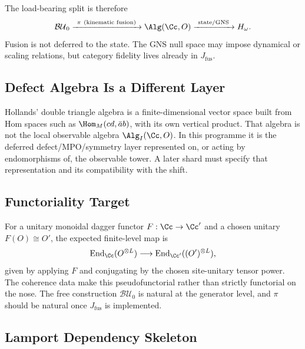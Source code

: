 The load-bearing split is therefore
\[
  \mathcal{BU}_0
  \xrightarrow{\ \pi\ \text{(kinematic fusion)}\ }
  \Alg(\Cc,O)
  \xrightarrow{\ \text{state/GNS}\ }
  H_\omega .
\]
Fusion is not deferred to the state.  The GNS null space may impose dynamical or
scaling relations, but category fidelity lives already in \(J_{\mathrm{fus}}\).

\subsection{Defect Algebra Is a Different Layer}

Hollands' double triangle algebra is a finite-dimensional vector space built
from Hom spaces such as \(\Hom_M(cd,\bar a b)\), with its own vertical product.
That algebra is not the local observable algebra \(\Alg_I(\Cc,O)\).  In this
programme it is the deferred defect/MPO/symmetry layer represented on, or
acting by endomorphisms of, the observable tower.  A later shard must specify
that representation and its compatibility with the shift.

\subsection{Functoriality Target}

For a unitary monoidal dagger functor
\(F:\Cc\to\Cc'\) and a chosen unitary \(F(O)\cong O'\), the expected finite-level
map is
\[
  \operatorname{End}_{\Cc}(O^{\otimes L})
  \longrightarrow
  \operatorname{End}_{\Cc'}((O')^{\otimes L}),
\]
given by applying \(F\) and conjugating by the chosen site-unitary tensor power.
The coherence data make this pseudofunctorial rather than strictly functorial
on the nose.  The free construction \(\mathcal{BU}_0\) is natural at the
generator level, and \(\pi\) should be natural once \(J_{\mathrm{fus}}\) is
implemented.

\subsection{Lamport Dependency Skeleton}

